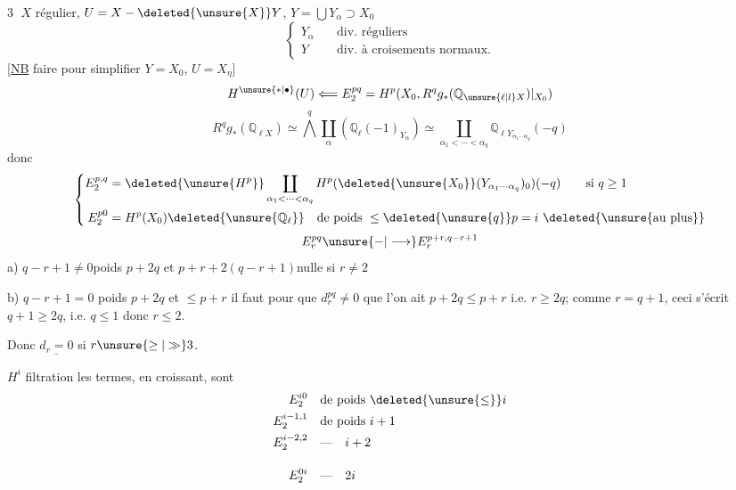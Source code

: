 \textcircled{3}
$X$ régulier, $U=X-\deleted{\unsure{X}}Y$, $Y=\bigcup Y_\alpha\supset X_0$
\[
\left\{\begin{aligned}
Y_\alpha&\quad\text{div. réguliers}\\
Y&\quad\text{div. à croisements normaux.}
\end{aligned}\right.
\]
[\uline{NB} faire pour simplifier $Y=X_0$, $U=X_\eta$]
\[
H^{\unsure{*|\bullet}}(U)\Longleftarrow E_2^{pq}=H^p(X_0,R^q g_*(\mathbb{Q}_{\unsure{\ell|l}X})\vert_{X_0})
\]
\[
R^q g_*(\mathbb{Q}_{\ell X})\simeq\mathop{\bigwedge}^{q}\coprod_\alpha(\mathbb{Q}_\ell(-1)_{Y_\alpha})\simeq\coprod_{\alpha_1<\cdots<\alpha_q}\mathbb{Q}_{\ell Y_{\alpha_1\cdots\alpha_q}}(-q)
\]
donc 
\[
\left\{\begin{aligned}
E_2^{p,q}&=\deleted{\unsure{H^p}}\coprod_{\alpha_1<\cdots<\alpha_q}H^p(\deleted{\unsure{X_0}}(Y_{\alpha_1\cdots\alpha_q})_0)(-q)\qquad\text{si }q\geq1\\
E_2^{p0}&=H^p(X_0)\deleted{\unsure{\mathbb{Q}_\ell}}\quad\text{de poids }\leq\deleted{\unsure{q}}p=i\ \deleted{\text{\unsure{au plus}}}
\end{aligned}\right.
\]
\[
E_r^{pq}\unsure{-|\longrightarrow}E_r^{p+r,q-r+1}
\]
a) $q-r+1\neq0$\quad poids $p+2q$ et $p+r+2(q-r+1)$\quad nulle si $r\neq2$

b) $q-r+1=0$  poids $p+2q$ et $\leq p+r$ il faut pour que $d_r^{pq}\neq0$ que l'on ait $p+2q\leq p+r$ i.e. $r\geq2q$; comme $r=q+1$, ceci s'écrit $q+1\geq2q$, i.e. $q\leq1$ donc $r\leq2$.

Donc $\underline{d_r=0}$ si $r\unsure{\geq|\gg}3$.


$H^i$ filtration  les termes, en croissant, sont
\[
\begin{aligned}
E_2^{i0}&\quad\text{de poids }\deleted{\unsure{\leq}}i\\
E_2^{i-1,1}&\quad\text{de poids }i+1\\
E_2^{i-2,2}&\quad\text{---}\quad i+2\\[1em]
E_2^{0i}&\quad\text{---}\quad2i
\end{aligned}
\]
